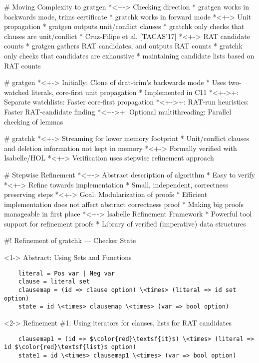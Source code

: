 \documentclass[fleqn]{beamer}
\newcommand\CC{C\nolinebreak[4]\hspace{-.05em}\raisebox{.3ex}{\relsize{-1}{\textbf{++}}}}
\begin{document}
# Moving Complexity to gratgen
  *<+-> Checking direction
    * gratgen works in backwards mode, trims certificate
    * gratchk works in forward mode
  *<+-> Unit propagation
    * gratgen outputs unit/conflict clauses
    * gratchk only checks that clauses are unit/conflict
    * Cruz-Filipe et al. [TACAS'17]
  *<+-> RAT candidate counts
    * gratgen gathers RAT candidates, and outputs RAT counts
    * gratchk only checks that candidates are exhaustive
      * maintaining candidate lists based on RAT counts
    
# gratgen
  *<+-> Initially: Clone of drat-trim's backwards mode
    * Uses two-watched literals, core-first unit propagation
    * Implemented in \CC11
  *<+->+: Separate watchlists: Faster core-first propagation
  *<+->+: RAT-run heuristics: Faster RAT-candidate finding
  *<+->+: Optional multithreading: Parallel checking of lemmas
    
# gratchk
  *<+-> Streaming for lower memory footprint
    * Unit/conflict clauses and deletion information not kept in memory
  *<+-> Formally verified with Isabelle/HOL
  *<+-> Verification uses stepwise refinement approach
    
# Stepwise Refinement    
  *<+-> Abstract description of algorithm
    * Easy to verify
  *<+-> Refine towards implementation
    * Small, independent, correctness preserving steps
  *<+-> Goal: Modularization of proofs
    * Efficient implementation does not affect abstract correctness proof
    * Making big proofs manageable in first place
  *<+-> Isabelle Refinement Framework
    * Powerful tool support for refinement proofs
    * Library of verified (imperative) data structures
    
#! Refinement of gratchk --- Checker State
  \begin{uncoverenv}<1->
  Abstract: Using Sets and Functions
  \begin{lstlisting}
    literal = Pos var | Neg var
    clause = literal set  
    clausemap = (id => clause option) \<times> (literal => id set option)
    state = id \<times> clausemap \<times> (var => bool option)
  \end{lstlisting}
  \end{uncoverenv}
    
  \begin{uncoverenv}<2->
  Refinement \#1: Using iterators for clauses, lists for RAT candidates  
  \begin{lstlisting}
    clausemap1 = (id => $\color{red}\textsf{it}$) \<times> (literal => id $\color{red}\textsf{list}$ option)
    state1 = id \<times> clausemap1 \<times> (var => bool option)
  \end{lstlisting}
  \end{uncoverenv}
    
\end{document}
